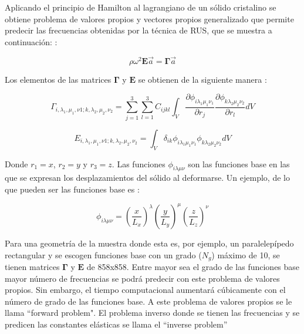 \documentclass[12pt]{article}
\begin{document}
Aplicando el principio de Hamilton al lagrangiano de un sólido cristalino se obtiene problema de valores propios y vectores propios generalizado que permite predecir las frecuencias obtenidas por la técnica de RUS, que se muestra a continuación: \cite{Leisure_1997}:

\begin{equation}
    \rho \omega^2 \bm{E} \vec{a} = \bm{\Gamma} \vec{a} 
\end{equation}

Los elementos de las matrices $\bm{\Gamma}$ y $\bm{E}$ se obtienen de la siguiente manera \cite{Ohno}: 

\begin{equation}
    \Gamma_{i, \lambda_1, \mu_1,  \nu1; k, \lambda_2, \mu_2, \nu_2} = \sum_{j=1}^{3} \sum_{l=1}^{3} {C_{ijkl} \int_{V}{\frac{\partial \phi_{i \lambda_{1} \mu_1 \nu_1}}{\partial r_j} \frac{\partial \phi_{k \lambda_2 \mu_2 \nu_2}}{\partial r_l} dV}}
\end{equation}

\begin{equation}
    E_{i, \lambda_1, \mu_1,  \nu1; k, \lambda_2, \mu_2, \nu_2} = \int_{V}{\delta_{ik} \phi_{i \lambda_1 \mu_1 \nu_1}  \phi_{k \lambda_2 \mu_2 \nu_2} dV}
\end{equation}

Donde $r_1 = x$, $r_2 = y$ y  $r_3 = z$. Las funciones $\phi_{i \lambda \mu \nu}$ son las funciones base en las que se expresan los desplazamientos del sólido al deformarse. Un ejemplo, de lo que pueden ser las funciones base es \cite{Demarest}: 

\begin{equation}
    \phi_{i \lambda \mu \nu} = \left(\frac{x}{L_x} \right)^{\lambda} \left(\frac{y}{L_y} \right)^{\mu} \left(\frac{z}{L_z} \right)^{\nu}
\end{equation}

Para una geometría de la muestra donde esta es, por ejemplo, un paralelepípedo rectangular y se escogen funciones base con un grado ($N_g$) máximo de 10, se tienen matrices $\bm{\Gamma}$ y $\bm{E}$ de 858x858. Entre mayor sea el grado de las funciones base mayor número de frecuencias se podrá predecir con este problema de valores propios. Sin embargo, el tiempo computacional aumentará cúbicamente con el número de grado de las funciones base. A este problema de valores propios se le llama ``forward problem". El problema inverso donde se tienen las frecuencias y se predicen las constantes elásticas se llama el ``inverse problem''
\end{document}
